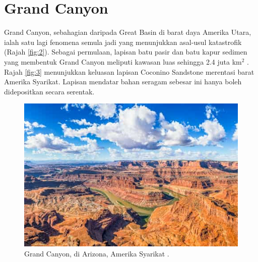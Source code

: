 \documentclass[10pt,twocolumn,letterpaper]{article}
\begin{document}
\section{Grand Canyon}

Grand Canyon, sebahagian daripada Great Basin di barat daya Amerika Utara, ialah satu lagi fenomena semula jadi yang menunjukkan asal-usul katastrofik (Rajah \ref{fig:2}). Sebagai permulaan, lapisan batu pasir dan batu kapur sedimen yang membentuk Grand Canyon meliputi kawasan luas sehingga 2.4 juta km$^2$ \cite{21}. Rajah \ref{fig:3} menunjukkan keluasan lapisan Coconino Sandstone merentasi barat Amerika Syarikat. Lapisan mendatar bahan seragam sebesar ini hanya boleh didepositkan secara serentak.

\begin{figure}[b]
\begin{center}
   \includegraphics[width=1\linewidth]{grand-canyon.jpg}

\end{center}
   \caption{Grand Canyon, di Arizona, Amerika Syarikat \cite{49}.}
\label{fig:2}
\label{fig:onecol}
\end{figure}
\end{document}
